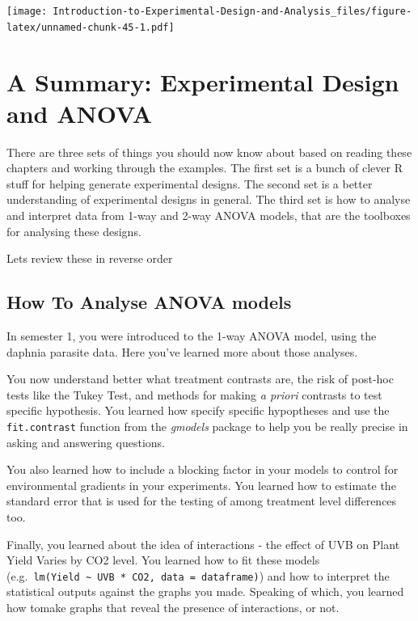 \documentclass[
]{book}
\begin{document}
\texttt{[image: Introduction-to-Experimental-Design-and-Analysis\_files/figure-latex/unnamed-chunk-45-1.pdf]}

\hypertarget{a-summary-experimental-design-and-anova}{%
\chapter{A Summary: Experimental Design and ANOVA}\label{a-summary-experimental-design-and-anova}}

There are three sets of things you should now know about based on reading these chapters and working through the examples. The first set is a bunch of clever R stuff for helping generate experimental designs. The second set is a better understanding of experimental designs in general. The third set is how to analyse and interpret data from 1-way and 2-way ANOVA models, that are the toolboxes for analysing these designs.

Lets review these in reverse order

\hypertarget{how-to-analyse-anova-models}{%
\section{How To Analyse ANOVA models}\label{how-to-analyse-anova-models}}

In semester 1, you were introduced to the 1-way ANOVA model, using the daphnia parasite data. Here you've learned more about those analyses.

You now understand better what treatment contrasts are, the risk of post-hoc tests like the Tukey Test, and methods for making \emph{a priori} contrasts to test specific hypothesis. You learned how specify specific hypoptheses and use the \texttt{fit.contrast} function from the \emph{gmodels} package to help you be really precise in asking and answering questions.

You also learned how to include a blocking factor in your models to control for environmental gradients in your experiments. You learned how to estimate the standard error that is used for the testing of among treatment level differences too.

Finally, you learned about the idea of interactions - the effect of UVB on Plant Yield Varies by CO2 level. You learned how to fit these models (e.g.~\texttt{lm(Yield\ \textasciitilde{}\ UVB\ *\ CO2,\ data\ =\ dataframe)}) and how to interpret the statistical outputs against the graphs you made. Speaking of which, you learned how tomake graphs that reveal the presence of interactions, or not.
\end{document}
